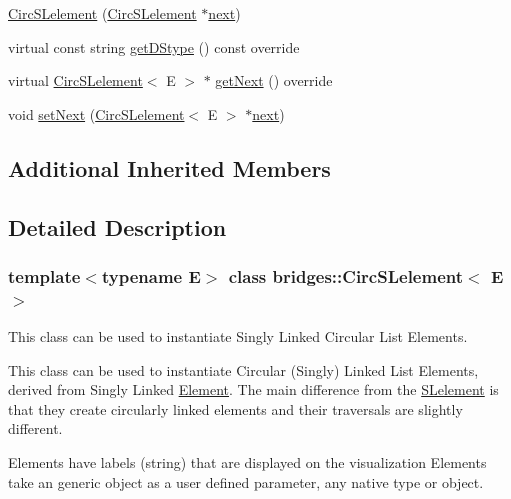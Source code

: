\begin{DoxyCompactItemize}
\item 
\mbox{\hyperlink{classbridges_1_1_circ_s_lelement_a1fda146fc0da1d8c7d6440cbbbb2ce42}{Circ\+S\+Lelement}} (\mbox{\hyperlink{classbridges_1_1_circ_s_lelement}{Circ\+S\+Lelement}} $\ast$\mbox{\hyperlink{classbridges_1_1_s_lelement_ad7449d10a09ebc52653a7baed812aa43}{next}})
\item 
virtual const string \mbox{\hyperlink{classbridges_1_1_circ_s_lelement_a4b27c205af46162371e3ffe05cbbe3d5}{get\+D\+Stype}} () const override
\item 
virtual \mbox{\hyperlink{classbridges_1_1_circ_s_lelement}{Circ\+S\+Lelement}}$<$ E $>$ $\ast$ \mbox{\hyperlink{classbridges_1_1_circ_s_lelement_aab863627c125c6f1075af7e7b7f340cf}{get\+Next}} () override
\item 
void \mbox{\hyperlink{classbridges_1_1_circ_s_lelement_a7b2512dd1cc559f0a89d9ab4aafed172}{set\+Next}} (\mbox{\hyperlink{classbridges_1_1_circ_s_lelement}{Circ\+S\+Lelement}}$<$ E $>$ $\ast$\mbox{\hyperlink{classbridges_1_1_s_lelement_ad7449d10a09ebc52653a7baed812aa43}{next}})
\end{DoxyCompactItemize}
\subsection*{Additional Inherited Members}


\subsection{Detailed Description}
\subsubsection*{template$<$typename E$>$\newline
class bridges\+::\+Circ\+S\+Lelement$<$ E $>$}

This class can be used to instantiate Singly Linked Circular List Elements. 

This class can be used to instantiate Circular (Singly) Linked List Elements, derived from Singly Linked \mbox{\hyperlink{classbridges_1_1_element}{Element}}. The main difference from the \mbox{\hyperlink{classbridges_1_1_s_lelement}{S\+Lelement}} is that they create circularly linked elements and their traversals are slightly different.

Elements have labels (string) that are displayed on the visualization Elements take an generic object as a user defined parameter, any native type or object.

